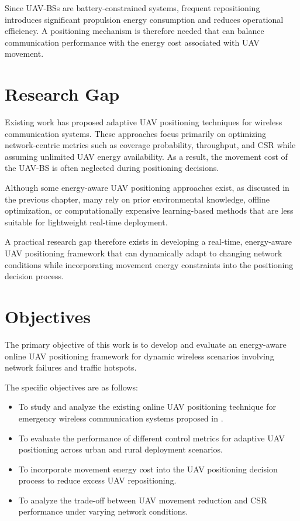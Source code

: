 \documentclass[12pt]{report}
\begin{document}
Since UAV-BSs are battery-constrained systems, frequent repositioning introduces significant propulsion energy consumption and reduces operational efficiency. A positioning mechanism is therefore needed that can balance communication performance with the energy cost associated with UAV movement.

\section{Research Gap}

Existing work has proposed adaptive UAV positioning techniques for wireless communication systems. These approaches focus primarily on optimizing network-centric metrics such as coverage probability, throughput, and CSR while assuming unlimited UAV energy availability. As a result, the movement cost of the UAV-BS is often neglected during positioning decisions.

Although some energy-aware UAV positioning approaches exist, as discussed in the previous chapter, many rely on prior environmental knowledge, offline optimization, or computationally expensive learning-based methods that are less suitable for lightweight real-time deployment.

A practical research gap therefore exists in developing a real-time, energy-aware UAV positioning framework that can dynamically adapt to changing network conditions while incorporating movement energy constraints into the positioning decision process.

\section{Objectives}

The primary objective of this work is to develop and evaluate an energy-aware online UAV positioning framework for dynamic wireless scenarios involving network failures and traffic hotspots.

The specific objectives are as follows:

\begin{itemize}
    \item To study and analyze the existing online UAV positioning technique for emergency wireless communication systems proposed in \cite{pijnappel2024online}.

    \item To evaluate the performance of different control metrics for adaptive UAV positioning across urban and rural deployment scenarios.

    \item To incorporate movement energy cost into the UAV positioning decision process to reduce excess UAV repositioning.

    \item To analyze the trade-off between UAV movement reduction and CSR performance under varying network conditions.

\end{itemize}
\end{document}
